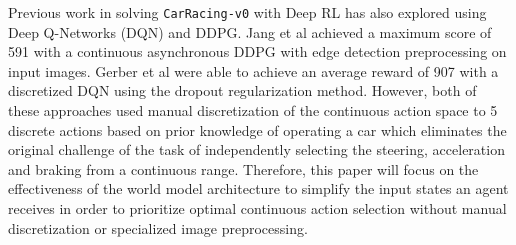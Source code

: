 Previous work in solving \texttt{CarRacing-v0} with Deep RL has also explored using Deep Q-Networks (DQN) and DDPG. Jang et al \cite{3.0} achieved a maximum score of 591 with a continuous asynchronous DDPG with edge detection preprocessing on input images. Gerber et al \cite{3.1} were able to achieve an average reward of 907 with a discretized DQN using the dropout regularization method. However, both of these approaches used manual discretization of the continuous action space to 5 discrete actions based on prior knowledge of operating a car which eliminates the original challenge of the task of independently selecting the steering, acceleration and braking from a continuous range. Therefore, this paper will focus on the effectiveness of the world model architecture to simplify the input states an agent receives in order to prioritize optimal continuous action selection without manual discretization or specialized image preprocessing.


